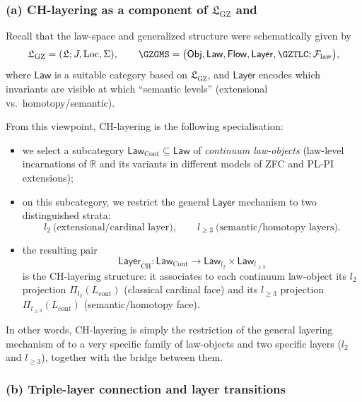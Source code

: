 \documentclass[11pt]{book}
\theoremstyle{plain}
\theoremstyle{definition}
\newcommand{\GZLS}{\ensuremath{\mathfrak{L}_{\mathrm{GZ}}}}       \newcommand{\GZLT}{\ensuremath{M_{!w}}}                           \newcommand{\GZLOC}{\ensuremath{A_M}}                             \newcommand{\GZLCurv}{\ensuremath{\mathcal{F}_{\mathrm{law}}}}
\begin{document}
\subsubsection*{(a) CH-layering as a component of \texorpdfstring{\GZLS}{GZ-LS} and \texorpdfstring{\GZGMS}{GZ-GMS}}

Recall that the law-space and generalized structure were schematically
given by
\[
  \GZLS = (\mathfrak{L};J,\mathrm{Loc},\Sigma),
  \qquad
  \GZGMS =
  \bigl(
    \mathsf{Obj},\mathsf{Law},\mathsf{Flow},\mathsf{Layer},
    \GZTLC;\GZLCurv
  \bigr),
\]
where $\mathsf{Law}$ is a suitable category based on $\GZLS$, and
$\mathsf{Layer}$ encodes which invariants are visible at which “semantic
levels” (extensional vs.\ homotopy/semantic).

From this viewpoint, CH-layering is the following specialisation:

\begin{itemize}
  \item we select a subcategory $\mathsf{Law}_{\mathrm{Cont}}
        \subseteq\mathsf{Law}$ of \emph{continuum law-objects}
        (law-level incarnations of $\mathbb{R}$ and its variants in
        different models of ZFC and PL-PI extensions);
  \item on this subcategory, we restrict the general $\mathsf{Layer}$
        mechanism to two distinguished strata:
        \[
           l_2 \ \text{(extensional/cardinal layer)},\qquad
           l_{\ge3} \ \text{(semantic/homotopy layers)}.
        \]
  \item the resulting pair
        \[
          \mathsf{Layer}_{\mathrm{CH}}
          : \mathsf{Law}_{\mathrm{Cont}}
          \longrightarrow
          \mathsf{Law}_{l_2}\times\mathsf{Law}_{l_{\ge3}}
        \]
        is the CH-layering structure: it associates to each
        continuum law-object its $l_2$ projection
        $\Pi_{l_2}(L_{\mathrm{cont}})$ (classical cardinal face) and its
        $l_{\ge3}$ projection $\Pi_{l_{\ge3}}(L_{\mathrm{cont}})$
        (semantic/homotopy face).
\end{itemize}

In other words, CH-layering is simply the restriction of the general
layering mechanism of \GZGMS to a very specific family of law-objects
and two specific layers ($l_2$ and $l_{\ge3}$), together with the
bridge between them.



\subsubsection*{(b) Triple-layer connection \texorpdfstring{\GZTLC}{GZ-TLC} and layer transitions}
\end{document}
